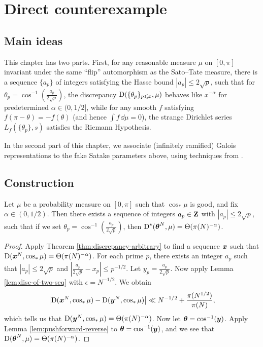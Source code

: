 
\chapter{Direct counterexample}





\section{Main ideas}

This chapter has two parts. First, for any reasonable measure $\mu$ on 
$[0,\pi]$ invariant under the same ``flip'' automorphism as the Sato--Tate 
measure, there is a sequence $\{a_p\}$ of integers satisfying the Hasse 
bound $|a_p|\leqslant 2\sqrt p$, such that for 
$\theta_p = \cos^{-1}\left(\frac{a_p}{2\sqrt p}\right)$, the discrepancy 
$\operatorname{D}(\{\theta_p\}_{p\leqslant x},\mu)$ behaves like $x^{-\alpha}$ for 
predetermined $\alpha\in (0,1/2]$, while for any smooth $f$ satisfying 
$f(\pi-\theta) = -f(\theta)$ (and hence $\int f\, \dd\mu = 0$), the 
strange Dirichlet series $L_f(\{\theta_p\},s)$ satisfies the Riemann 
Hypothesis. 

In the second part of this chapter, we associate (infinitely ramified) Galois 
representations to the fake Satake parameters above, using techniques from 
\cite{pande-2011,khare-larsen-ramakrishna-2005}. 





\section{Construction}

\begin{theorem}
Let $\mu$ be a probability measure on $[0,\pi]$ such that $\cos_\ast\mu$ is 
good, and fix $\alpha\in (0,1/2)$. Then there exists a sequence of integers 
$a_p\in \mathbf{Z}$ with $|a_p|\leqslant 2\sqrt p$, such that if we set 
$\theta_p = \cos^{-1}\left(\frac{a_p}{2\sqrt p}\right)$, then 
$\operatorname{D}^\star({\boldsymbol\theta}^N,\mu) = \Theta(\pi(N)^{-\alpha})$. 
\end{theorem}
\begin{proof}
Apply Theorem \ref{thm:discrepancy-arbitrary} to find a sequence ${\boldsymbol x}$ such 
that $\operatorname{D}({\boldsymbol x}^N,\cos_\ast \mu) = \Theta(\pi(N)^{-\alpha})$. For each prime 
$p$, there exists an integer $a_p$ such that $|a_p|\leqslant 2\sqrt p$ and 
$\left| \frac{a_p}{2\sqrt p} - x_p\right| \leqslant p^{-1/2}$. Let 
$y_p = \frac{a_p}{2\sqrt p}$. Now apply 
Lemma \ref{lem:disc-of-two-seq} with $\epsilon = N^{-1/2}$. We obtain 
\[
	\left| \operatorname{D}({\boldsymbol x}^N,\cos_\ast \mu) - \operatorname{D}({\boldsymbol y}^N, \cos_\ast \mu)\right| \ll  N^{-1/2} + \frac{\pi(N^{1/2})}{\pi(N)} ,
\]
which tells us that $\operatorname{D}({\boldsymbol y}^N,\cos_\ast\mu) = \Theta(\pi(N)^{-\alpha})$. 
Now let ${\boldsymbol\theta} = \cos^{-1}({\boldsymbol y})$. Apply Lemma \ref{lem:pushforward-reverse} to 
${\boldsymbol\theta} = \cos^{-1}({\boldsymbol y})$, and we see that 
$\operatorname{D}({\boldsymbol\theta}^N,\mu) = \Theta(\pi(N)^{-\alpha})$. 
\end{proof}

